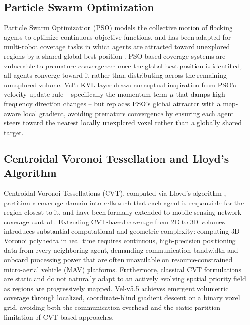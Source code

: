\documentclass[10pt,journal]{IEEEtran}
\begin{document}
\subsection{Particle Swarm Optimization}
Particle Swarm Optimization (PSO) models the collective motion of flocking
agents to optimize continuous objective functions, and has been adapted for
multi-robot coverage tasks in which agents are attracted toward unexplored
regions by a shared global-best position \cite{banks2007}. PSO-based
coverage systems are vulnerable to premature convergence: once the global
best position is identified, all agents converge toward it rather than
distributing across the remaining unexplored volume. Vel's KVL layer draws
conceptual inspiration from PSO's velocity update rule -- specifically the
momentum term $\mu$ that damps high-frequency direction changes -- but
replaces PSO's global attractor with a map-aware local gradient, avoiding
premature convergence by ensuring each agent steers toward the nearest
locally unexplored voxel rather than a globally shared target.

\subsection{Centroidal Voronoi Tessellation and Lloyd's Algorithm}
Centroidal Voronoi Tessellations (CVT), computed via Lloyd's algorithm
\cite{lloyd1982}, partition a coverage domain into cells such that each
agent is responsible for the region closest to it, and have been formally
extended to mobile sensing network coverage control \cite{cortes2004}.
Extending CVT-based coverage from 2D to 3D volumes introduces substantial
computational and geometric complexity: computing 3D Voronoi polyhedra in
real time requires continuous, high-precision positioning data from every
neighboring agent, demanding communication bandwidth and onboard processing
power that are often unavailable on resource-constrained micro-aerial
vehicle (MAV) platforms. Furthermore, classical CVT formulations are
static and do not naturally adapt to an actively evolving spatial priority
field as regions are progressively mapped. Vel-v5.5 achieves emergent
volumetric coverage through localized, coordinate-blind gradient descent
on a binary voxel grid, avoiding both the communication overhead and the
static-partition limitation of CVT-based approaches.
\end{document}
